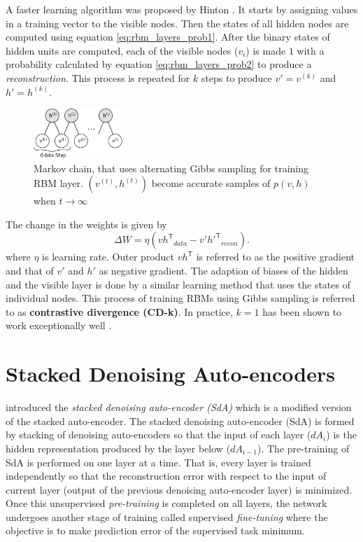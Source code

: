 A faster learning algorithm was proposed by Hinton \cite{hinton2002training,hinton2006reducing,hinton2010practical}. It starts by assigning values in a training vector to the visible nodes. Then the states of all hidden nodes are computed using equation \ref{eq:rbm_layers_prob1}. After the binary states of hidden units are computed, each of the visible nodes ($v_i$) is made $1$ with a probability calculated by equation \ref{eq:rbm_layers_prob2} to produce a \textit{reconstruction}. This process is repeated for $k$ steps to produce $v'= v^{(k)}$ and $h' = h^{(k)}$. 

\begin{figure}[ht]
\centering
\includegraphics[width=0.3\textwidth]{./imgs/markov_chain.png}
\caption[Markov chain of training RBM layer]{Markov chain, that uses alternating Gibbs sampling for training RBM layer. $(v^{(t)}, h^{(t)})$ become accurate samples of $p(v,h)$ when $t \rightarrow \infty$}
\label{fig:rbmmarkovChain}
\end{figure}

The change in the weights is given by
$$ \Delta W = \eta ({vh^\mathsf{T}}_{data} - {v'h'^{\mathsf{T}}}_{recon}). $$
where $\eta$ is learning rate. Outer product $vh^\mathsf{T}$ is referred to as the positive gradient and that of $v'$ and $h'$ as negative gradient. The adaption of biases of the hidden and the visible layer is done by a similar learning method that uses the states of individual nodes. This process of training RBMs using Gibbs sampling is referred to as \textbf{contrastive divergence (CD-k)}. In practice, $k=1$ has been shown to work exceptionally well \cite{hinton2010practical}.

\section{Stacked Denoising Auto-encoders}
\citet{vincent2010stacked} introduced the \emph{stacked denoising auto-encoder (SdA)} which is a modified version of the stacked auto-encoder. The stacked denoising auto-encoder (SdA) is formed by stacking of denoising auto-encoders so that the input of each layer ($dA_i$) is the hidden representation produced by the layer below ($dA_{i-1}$). The pre-training of SdA is performed on one layer at a time. That is, every layer is trained independently so that the reconstruction error with respect to the input of current layer (output of the previous denoising auto-encoder layer) is minimized. Once this unsupervised \textit{pre-training} is completed on all layers, the network undergoes another stage of training called supervised \textit{fine-tuning} where the objective is to make prediction error of the supervised task minimum.

